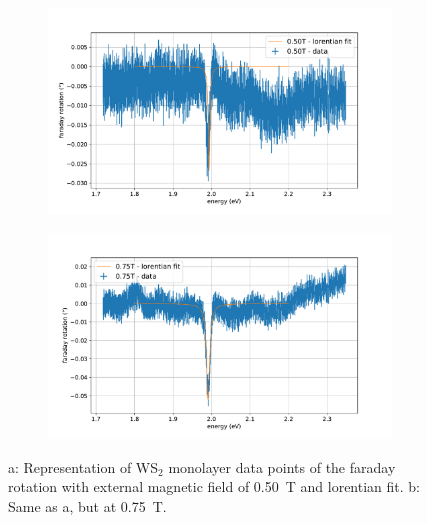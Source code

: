 \begin{figure}[!ht]
    \centering
    \begin{subfigure}{0.47\textwidth}
        \centering
        \includegraphics[width=1.0\textwidth]{plots/WS2_500mT.pdf}
    \caption{}
    \end{subfigure}
    \begin{subfigure}{0.47\textwidth}
        \centering
        \includegraphics[width=\textwidth]{plots/WS2_750mT.pdf}
        \caption{}
    \end{subfigure}
    \caption{a: Representation of WS$_2$ monolayer data points of the faraday rotation with external magnetic field of \SI{0.50}{\tesla} and lorentian fit. b: Same as a, but at \SI{0.75}{\tesla}.} %
\end{figure}

